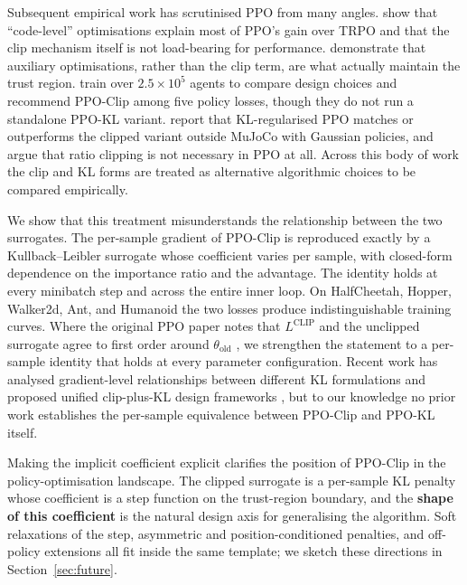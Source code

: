 \documentclass{article}
\begin{document}
Subsequent empirical work has scrutinised PPO from many angles.
\citet{engstrom2020implementation} show that ``code-level''
optimisations explain most of PPO's gain over TRPO and that the clip
mechanism itself is not load-bearing for performance.
\citet{ilyas2020closer} demonstrate that auxiliary optimisations,
rather than the clip term, are what actually maintain the trust
region. \citet{andrychowicz2021matters} train over $2.5 \times 10^5$
agents to compare design choices and recommend PPO-Clip among five
policy losses, though they do not run a standalone PPO-KL variant.
\citet{hsu2020revisiting} report that KL-regularised PPO matches or
outperforms the clipped variant outside MuJoCo with Gaussian
policies, and \citet{sun2022espo} argue that ratio clipping is not
necessary in PPO at all. Across this body of work the clip and KL
forms are treated as alternative algorithmic choices to be compared
empirically.

We show that this treatment misunderstands the relationship between
the two surrogates. The per-sample gradient of PPO-Clip is reproduced
exactly by a Kullback--Leibler surrogate whose coefficient varies
per sample, with closed-form dependence on the importance ratio and
the advantage. The identity holds at every minibatch step and across
the entire inner loop. On HalfCheetah, Hopper, Walker2d, Ant, and
Humanoid \citep{todorov2012mujoco} the two losses produce
indistinguishable training curves. Where the original PPO
paper notes that $L^{\mathrm{CLIP}}$ and the unclipped surrogate
agree to first order around $\theta_{\mathrm{old}}$
\citep{schulman2017ppo}, we strengthen the statement to a per-sample
identity that holds at every parameter configuration. Recent work
has analysed gradient-level relationships between different KL
formulations \citep{yao2025rethinkingkl} and proposed unified
clip-plus-KL design frameworks \citep{zhang2026rpg}, but to our
knowledge no prior work establishes the per-sample equivalence
between PPO-Clip and PPO-KL itself.

Making the implicit coefficient explicit clarifies the position of
PPO-Clip in the policy-optimisation landscape. The clipped surrogate
is a per-sample KL penalty whose coefficient is a step function on
the trust-region boundary, and the \textbf{shape of this
coefficient} is the natural design axis for generalising the
algorithm. Soft relaxations of the step, asymmetric and
position-conditioned penalties, and off-policy extensions all fit
inside the same template; we sketch these directions in
Section~\ref{sec:future}.
\end{document}
